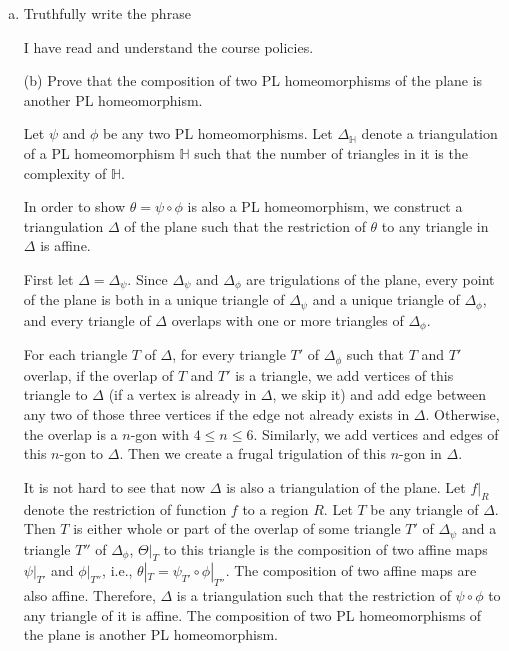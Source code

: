 \documentclass[11pt]{article}
\begin{document}
\begin{enumerate}[(a)]\itemsep0pt
  \item
    Truthfully write the phrase 

\begin{solution}
  I have read and understand the course policies.
\end{solution}

  \item[(b)]
    Prove that the composition of two PL homeomorphisms of the plane is another PL homeomorphism.

\begin{solution}
  Let \(\psi\) and \(\phi\) be any two PL homeomorphisms.
  Let \(\Delta_{\mathbb{H}}\) denote a triangulation of a PL homeomorphism \(\mathbb{H}\) such that the number of triangles in it is the complexity of \(\mathbb{H}\).

  In order to show \(\theta=\psi\circ\phi\) is also a PL homeomorphism, we construct a triangulation \(\Delta\) of the plane such that the restriction of \(\theta\) to any triangle in \(\Delta\) is affine.

  First let \(\Delta=\Delta_{\psi}\).
  Since \(\Delta_{\psi}\) and \(\Delta_{\phi}\) are trigulations of the plane, every point of the plane is both in a unique triangle of \(\Delta_{\psi}\) and a unique triangle of \(\Delta_{\phi}\), and every triangle of \(\Delta\) overlaps with one or more triangles of \(\Delta_{\phi}\).

  For each triangle \(T\) of \(\Delta\), for every triangle \(T'\) of \(\Delta_{\phi}\) such that \(T\) and \(T'\) overlap, if the overlap of \(T\) and \(T'\) is a triangle, we add vertices of this triangle to \(\Delta\) (if a vertex is already in \(\Delta\), we skip it) and add edge between any two of those three vertices if the edge not already exists in \(\Delta\).
 Otherwise, the overlap is a \(n\)-gon with \(4\le n\le 6\). Similarly, we add vertices and edges of this \(n\)-gon to \(\Delta\). Then we create a frugal trigulation of this \(n\)-gon in \(\Delta\).

 It is not hard to see that now \(\Delta\) is also a triangulation of the plane. Let \(f|_{R}\) denote the restriction of function \(f\) to a region \(R\). Let \(T\) be any triangle of \(\Delta\). Then \(T\) is either whole or part of the overlap of some triangle \(T'\) of \(\Delta_{\psi}\) and a triangle \(T''\) of \(\Delta_{\phi}\), \(\Theta|_{T}\) to this triangle is the composition of two affine maps \(\psi|_{T'}\) and \(\phi|_{T''}\), i.e., \(\theta|_{T}=\psi_{T'}\circ \phi|_{T''}\). The composition of two affine maps are also affine. Therefore, \(\Delta\) is a triangulation such that the restriction of \(\psi\circ \phi\) to any triangle of it is affine. The composition of two PL homeomorphisms of the plane is another PL homeomorphism.


\end{solution}
\end{enumerate}
\end{document}
